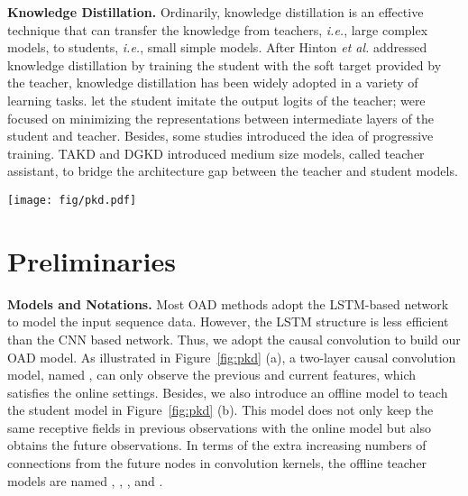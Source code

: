 \documentclass[final]{cvpr}
\begin{document}
\vspace{4pt}
\noindent \textbf{Knowledge Distillation.} Ordinarily, knowledge distillation is an effective technique that can transfer the knowledge from teachers, \emph{i.e.}, large complex models, to students, \emph{i.e.}, small simple models. After Hinton \emph{et al.} \cite{hinton2015distilling} addressed knowledge distillation by training the student with the soft target provided by the teacher, knowledge distillation has been widely adopted in a variety of learning tasks. \cite{ba2014do, ahn2019variational, cho2019on, hegde2020variational, yang2019snapshot, liu2019knowledge} let the student imitate the output logits of the teacher; \cite{romero2014fitnets, tung2019similarity, shen2019meal, aguilar2019knowledge, gao2020residual, xu2020kernel} were focused on minimizing the representations between intermediate layers of the student and teacher.
Besides, some studies introduced the idea of progressive training. TAKD \cite{mirzadeh2020improved} and DGKD \cite{son2020densely} introduced medium size models, called teacher assistant, to bridge the architecture gap between the teacher and student models. 







\begin{figure*}[t]
\begin{center}
  \texttt{[image: fig/pkd.pdf]}
\end{center}
\caption{(a) and (b) show the model structures of the student  and teacher . Both of them use the 1D temporal convolution layers.  is the extracted video features.  and  denote original student features;  and  denote auxiliary nodes;  and  denote teacher features.  and  are output logits. (c) shows the curriculum learning procedure that the student model  are trained from  to . , ,  are also teacher models that can see different length of future data between  and .}
\label{fig:pkd}
\end{figure*}


\section{Preliminaries}

\noindent \textbf{Models and Notations.} Most OAD methods \cite{gao2019startnet, xu2019trn, eun2020learning} adopt the LSTM-based network to model the input sequence data. However, the LSTM structure is less efficient than the CNN based network. Thus, we adopt the causal convolution \cite{oord2016wavenet} to build our OAD model. As illustrated in Figure~\ref{fig:pkd} (a), a two-layer causal convolution model, named , can only observe the previous and current features, which satisfies the online settings. Besides, we also introduce an offline model to teach the student model  in Figure~\ref{fig:pkd} (b). This model does not only keep the same receptive fields in previous observations with the online model but also obtains the future observations. In terms of the extra increasing numbers of connections from the future nodes in convolution kernels, the offline teacher models are named , , , and .
\end{document}
